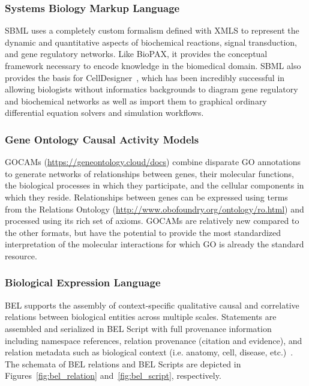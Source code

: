 \subsubsection{Systems Biology Markup Language}

\ac{SBML} uses a completely custom formalism defined with \ac{XMLS} to represent the dynamic and quantitative aspects of biochemical reactions, signal transduction, and gene regulatory networks\cite{Hucka2003}.
Like \ac{BioPAX}, it provides the conceptual framework necessary to encode knowledge in the biomedical domain.
\ac{SBML} also provides the basis for CellDesigner~\cite{Funahashi2003}, which has been incredibly successful in allowing biologists without informatics backgrounds to diagram gene regulatory and biochemical networks as well as import them to graphical ordinary differential equation solvers and simulation workflows.

\subsubsection{Gene Ontology Causal Activity Models}

\acp{GOCAM} (\url{https://geneontology.cloud/docs}) combine disparate \ac{GO} annotations to generate networks of relationships between genes, their molecular functions, the biological processes in which they participate, and the cellular components in which they reside.
Relationships between genes can be expressed using terms from the Relations Ontology (\url{http://www.obofoundry.org/ontology/ro.html}) and processed using its rich set of axioms.
\acp{GOCAM} are relatively new compared to the other formats, but have the potential to provide the most standardized interpretation of the molecular interactions for which \ac{GO} is already the standard resource.

\subsubsection{Biological Expression Language}

\ac{BEL} supports the assembly of context-specific qualitative causal and correlative relations between biological entities across multiple scales.
Statements are assembled and serialized in \ac{BEL} Script with full provenance information including namespace references, relation provenance (citation and evidence), and relation metadata such as biological context (i.e. anatomy, cell, disease, etc.)~\cite{Slater2014}.
The schemata of BEL relations and BEL Scripts are depicted in Figures~\ref{fig:bel_relation} and~\ref{fig:bel_script}, respectively.

